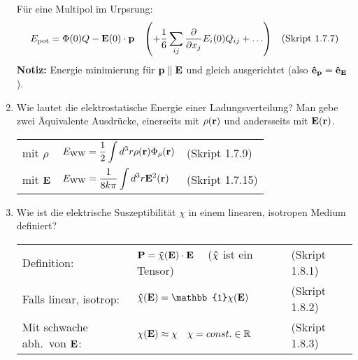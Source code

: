 \documentclass{scrartcl}
\newcommand{\ds}{\displaystyle}
\newcommand{\smref}[1]{\quad\text{(Skript #1)}}
\begin{document}
\begin{enumerate}
          Für eine Multipol im Urpsrung:
          $$E_{\text{pot}}=\Phi(0)Q-\vb E(0)\cdot\vb p 
          \quad\qty(+ \frac{1}{6}\sum_{ij}\pdv{x_j}E_i(0)Q_{ij}+\ldots)
          \smref{1.7.7}$$
          \textbf{Notiz:} Energie minimierung für $\vb p\parallel \vb E$
          und gleich ausgerichtet (also $\vu e_{\vb p}=\vu e_{\vb E}$).\\

    \item Wie lautet die elektrostatische Energie einer Ladungsverteilung?
          Man gebe zwei Äquivalente Ausdrücke, einerseits mit $\rho(\vb r)$
          und andersseits mit $\vb E(\vb r)$.
          \begin{center}
          \begin{tabular}{lll}
            mit $\rho$    & $\ds E_{\text{WW}}=
                            \frac{1}{2}\int d^3 r\rho(\vb r)
                            \Phi_\rho(\vb r)$
                              &(Skript 1.7.9)\\
            mit $\vb E$   & $\ds E_{\text{WW}}=\frac{1}{8k\pi}
                             \int d^3 r\vb E^2(\vb r)$
                              &(Skript 1.7.15)\\
          \end{tabular}
          \end{center}

    \clearpage
    \item Wie ist die elektrische Suszeptibilität $\chi$ in einem 
          linearen, isotropen Medium definiert?
          \begin{center}
          \begin{tabular}{lll}
            Definition:             & $\ds\vb P = 
                                      \vu \chi(\vb E)\cdot \vb E\quad$
                                      ($\vu\chi$ ist ein Tensor)
                                      & (Skript 1.8.1) \\
            Falls linear, isotrop: 
                                    & $\ds\vu\chi(\vb E)=
                                         \mathbb{1}\chi(\vb E)$
                                      & (Skript 1.8.2) \\
            Mit schwache abh.\ von $\vb E$:
                                    & $\chi(\vb E)\approx\chi
                                       \quad\chi=const.\in\mathbb{R}$
                                      & (Skript 1.8.3) \\
            
          \end{tabular}
          \end{center}


\end{enumerate}
\end{document}
